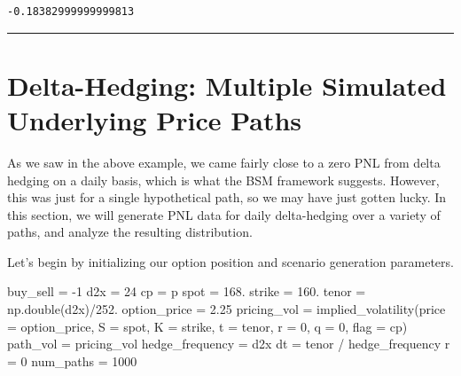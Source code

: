\documentclass[
  letterpaper,
  DIV=11,
  numbers=noendperiod]{scrreprt}
\newenvironment{Shaded}{\begin{snugshade}}{\end{snugshade}}
\newcommand{\DecValTok}[1]{\textcolor[rgb]{0.68,0.00,0.00}{#1}}
\newcommand{\FloatTok}[1]{\textcolor[rgb]{0.68,0.00,0.00}{#1}}
\newcommand{\NormalTok}[1]{\textcolor[rgb]{0.00,0.23,0.31}{#1}}
\newcommand{\OperatorTok}[1]{\textcolor[rgb]{0.37,0.37,0.37}{#1}}
\newcommand{\StringTok}[1]{\textcolor[rgb]{0.13,0.47,0.30}{#1}}
\begin{document}
\begin{verbatim}
-0.18382999999999813
\end{verbatim}

\begin{center}\rule{0.5\linewidth}{0.5pt}\end{center}

\hypertarget{delta-hedging-multiple-simulated-underlying-price-paths}{%
\section{Delta-Hedging: Multiple Simulated Underlying Price
Paths}\label{delta-hedging-multiple-simulated-underlying-price-paths}}

As we saw in the above example, we came fairly close to a zero PNL from
delta hedging on a daily basis, which is what the BSM framework
suggests. However, this was just for a single hypothetical path, so we
may have just gotten lucky. In this section, we will generate PNL data
for daily delta-hedging over a variety of paths, and analyze the
resulting distribution.

Let's begin by initializing our option position and scenario generation
parameters.

\begin{Shaded}
\begin{Highlighting}[]
\NormalTok{buy\_sell }\OperatorTok{=} \OperatorTok{{-}}\DecValTok{1}
\NormalTok{d2x }\OperatorTok{=} \DecValTok{24}
\NormalTok{cp }\OperatorTok{=} \StringTok{\textquotesingle{}p\textquotesingle{}}
\NormalTok{spot }\OperatorTok{=} \FloatTok{168.}
\NormalTok{strike }\OperatorTok{=} \FloatTok{160.}
\NormalTok{tenor }\OperatorTok{=}\NormalTok{ np.double(d2x)}\OperatorTok{/}\FloatTok{252.}
\NormalTok{option\_price }\OperatorTok{=} \FloatTok{2.25}
\NormalTok{pricing\_vol }\OperatorTok{=}\NormalTok{ implied\_volatility(price }\OperatorTok{=}\NormalTok{ option\_price, S }\OperatorTok{=}\NormalTok{ spot, K }\OperatorTok{=}\NormalTok{ strike, t }\OperatorTok{=}\NormalTok{ tenor, r }\OperatorTok{=} \DecValTok{0}\NormalTok{, q }\OperatorTok{=} \DecValTok{0}\NormalTok{, flag }\OperatorTok{=}\NormalTok{ cp)}
\NormalTok{path\_vol }\OperatorTok{=}\NormalTok{ pricing\_vol}
\NormalTok{hedge\_frequency }\OperatorTok{=}\NormalTok{ d2x}
\NormalTok{dt }\OperatorTok{=}\NormalTok{ tenor }\OperatorTok{/}\NormalTok{ hedge\_frequency}
\NormalTok{r }\OperatorTok{=} \DecValTok{0}
\NormalTok{num\_paths }\OperatorTok{=} \DecValTok{1000}
\end{Highlighting}
\end{Shaded}
\end{document}
